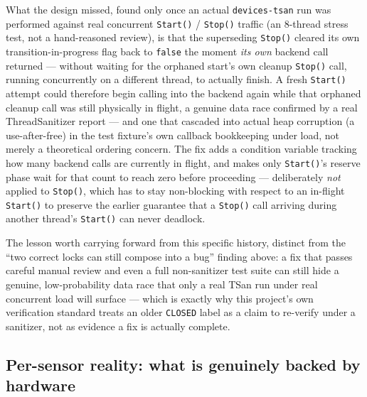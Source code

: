 What the design missed, found only once an actual \texttt{devices-tsan} run was performed
against real concurrent \texttt{Start()} / \texttt{Stop()} traffic (an 8-thread stress test, not
a hand-reasoned review), is that the superseding \texttt{Stop()} cleared its own
transition-in-progress flag back to \texttt{false} the moment \emph{its own} backend call
returned --- without waiting for the orphaned start's own cleanup \texttt{Stop()} call,
running concurrently on a different thread, to actually finish. A fresh \texttt{Start()}
attempt could therefore begin calling into the backend again while that orphaned cleanup call
was still physically in flight, a genuine data race confirmed by a real ThreadSanitizer report
--- and one that cascaded into actual heap corruption (a use-after-free) in the test fixture's
own callback bookkeeping under load, not merely a theoretical ordering concern. The fix adds a
condition variable tracking how many backend calls are currently in flight, and makes only
\texttt{Start()}'s reserve phase wait for that count to reach zero before proceeding ---
deliberately \emph{not} applied to \texttt{Stop()}, which has to stay non-blocking with respect
to an in-flight \texttt{Start()} to preserve the earlier guarantee that a \texttt{Stop()} call
arriving during another thread's \texttt{Start()} can never deadlock.

The lesson worth carrying forward from this specific history, distinct from the ``two correct
locks can still compose into a bug'' finding above: a fix that passes careful manual review and
even a full non-sanitizer test suite can still hide a genuine, low-probability data race that
only a real TSan run under real concurrent load will surface --- which is exactly why this
project's own verification standard treats an older \texttt{CLOSED} label as a claim to
re-verify under a sanitizer, not as evidence a fix is actually complete.

\subsection{Per-sensor reality: what is genuinely backed by hardware}

